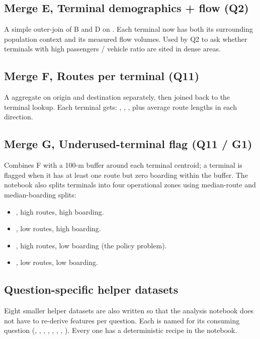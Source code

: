\subsection{Merge E, Terminal demographics + flow (Q2)}

A simple outer-join of B and D on . Each terminal now
has both its surrounding population context and its measured flow
volumes. Used by Q2 to ask whether terminals with high passengers /
vehicle ratio are sited in dense areas.

\subsection{Merge F, Routes per terminal (Q11)}

A  aggregate on origin and destination separately, then
joined back to the terminal lookup. Each terminal gets:
, , , plus
average route lengths in each direction.

\subsection{Merge G, Underused-terminal flag (Q11 / G1)}

Combines F with a 100-m buffer around each terminal centroid; a terminal
is flagged  when it has at least one route but zero
boarding within the buffer. The notebook also splits terminals into
four operational zones using median-route and median-boarding splits:

\begin{itemize}
 \item {}, high routes, high boarding.
 \item {}, low routes, high boarding.
 \item {}, high routes, low boarding (the policy problem).
 \item {}, low routes, low boarding.
\end{itemize}

\subsection{Question-specific helper datasets}

Eight smaller helper datasets are also written so that the analysis
notebook does not have to re-derive features per question. Each is
named for its consuming question (,
, ,
, ,
, ,
). Every one has a
deterministic recipe in the notebook.
